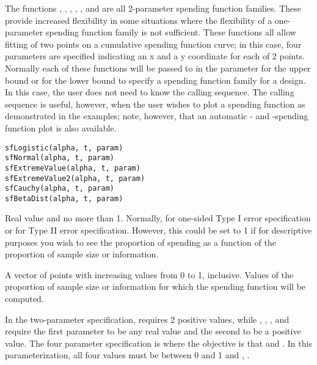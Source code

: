 \begin{Description}\relax
The functions , , , , , 
and  are all 2-parameter spending function families.
These provide increased flexibility in some situations where the flexibility of a one-parameter spending function 
family is not sufficient.
These functions all allow fitting of two points on a cumulative spending function curve; in this case, four parameters
are specified indicating an x and a y coordinate for each of 2 points.
Normally each of these functions will be passed to  in the parameter 
 for the upper bound or
 for the lower bound to specify a spending function family for a design.
In this case, the user does not need to know the calling sequence.
The calling sequence is useful, however, when the user wishes to plot a spending function as demonstrated in the examples; note, however, that an automatic - and -spending function plot is also available.
\end{Description}
\begin{Usage}
\begin{verbatim}
sfLogistic(alpha, t, param)
sfNormal(alpha, t, param)
sfExtremeValue(alpha, t, param)
sfExtremeValue2(alpha, t, param)
sfCauchy(alpha, t, param)
sfBetaDist(alpha, t, param)
\end{verbatim}
\end{Usage}
\begin{Arguments}
\begin{ldescription}
\item[\code{alpha}] Real value  and no more than 1. Normally, 
 for one-sided Type I error specification
or  for Type II error specification. However, this could be set to 1 if for descriptive purposes
you wish to see the proportion of spending as a function of the proportion of sample size or information.
\item[\code{t}] A vector of points with increasing values from 0 to 1, inclusive. Values of the proportion of 
sample size or information for which the spending function will be computed.
\item[\code{param}] In the two-parameter specification,  requires 2 positive values, while
, , ,  and  require the first parameter 
to be any real value and the second to be a positive value. 
The four parameter specification is 
where the objective is that  and .
In this parameterization, all four values must be between 0 and 1 and , .

\end{ldescription}
\end{Arguments}
